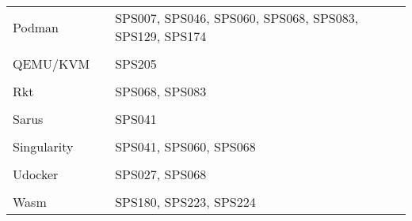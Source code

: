 \begin{longtable}{Z Y Y Y}
\\
Podman & & SPS007, SPS046, SPS060, SPS068, SPS083, SPS129, SPS174 & \\
\\
QEMU/KVM & & SPS205 & \\
\\
Rkt & & SPS068, SPS083 & \\
\\
Sarus & & SPS041 & \\
\\
Singularity & & SPS041, SPS060, SPS068 & \\
\\
Udocker & & SPS027, SPS068 & \\
\\
Wasm & & SPS180, SPS223, SPS224 & \\
\bottomrule
\end{longtable}

